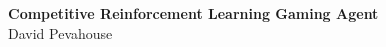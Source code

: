 


\vspace{2cm}
    \begin{center}       
        \vspace*{2cm}
        {\LARGE {\textbf{Competitive Reinforcement Learning Gaming Agent}}} \\
        \vspace{1cm}
        \Large{David Pevahouse}
    \end{center}
    \vspace{2cm}

\vfill

\thispagestyle{empty}

\newpage
\tableofcontents
\thispagestyle{empty}
